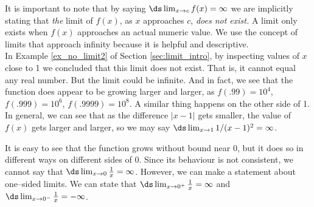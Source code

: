 It is important to note that by saying $\ds \lim_{x\to c}f(x) = \infty$ we are implicitly stating that \textit{the} limit of $f(x)$, as $x$ approaches $c$, \textit{does not exist.} A limit only exists when $f(x)$ approaches an actual numeric value. We use the concept of limits that approach infinity because it is helpful and descriptive.\\

{In Example \ref{ex_no_limit2} of Section \ref{sec:limit_intro}, by inspecting values of $x$ close to 1 we concluded that this limit does not exist.  That is, it cannot equal any real number.  But the limit could be infinite.  And in fact, we see that the function does appear to be growing larger and larger, as $f(.99)=10^4$, $f(.999)=10^6$, $f(.9999)=10^8$.  A similar thing happens on the other side of 1.  In general, we can see that as the difference $\lvert x-1\rvert$ gets smaller, the value of $f(x)$ gets larger and larger,  so we may say $\ds\lim_{x\rightarrow 1}1/{(x-1)^2}=\infty$.
}\\
\pagebreak

{It is easy to see that the function grows without bound near 0, but it does so in different ways on different sides of 0.  Since its behaviour is not consistent, we cannot say that $\ds \lim_{x\to 0}\frac{1}{x}=\infty$. However, we can make a statement about one--sided limits. We can state that $\ds \lim_{x\rightarrow 0^+}\frac1x=\infty$ and $\ds \lim_{x\rightarrow 0^-}\frac1x=-\infty$.  

}

